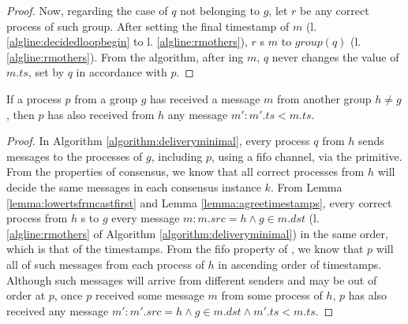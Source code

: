\documentclass[times, 10pt]{article}
\begin{document}
\begin{proof}
Now, regarding the case of $q$ not belonging to $g$, let $r$ be any correct process of such group. After setting the final timestamp of $m$ (l. \ref{algline:decidedloopbegin} to l. \ref{algline:rmothers}), $r$ \rmcast{}s $m$ to $group(q)$ (l. \ref{algline:rmothers}). From the algorithm, after \rmdel{}ing $m$, $q$ never changes the value of $m.ts$, set by $q$ in accordance with $p$.%
\end{proof}






\begin{lems} \label{lemma:groupfifo}
If a process $p$ from a group $g$ has received a message $m$ from another group $h \neq g$, then $p$ has also received from $h$ any message $m' : m'.ts < m.ts$.
\end{lems}

\begin{proof}
In Algorithm \ref{algorithm:deliveryminimal}, every process $q$ from $h$ sends messages to the processes of $g$, including $p$, using a fifo channel, via the \rmcast{} primitive. From the properties of consensus, we know that all correct processes from $h$ will decide the same messages in each consensus instance $k$. From Lemma \ref{lemma:lowertsfrmcastfirst} and Lemma \ref{lemma:agreetimestamps}, every correct process from $h$ \rmcast{}s to $g$ every message $m : m.src = h \wedge g \in m.dst$ (l. \ref{algline:rmothers} of Algorithm \ref{algorithm:deliveryminimal}) in the same order, which is that of the timestamps. From the fifo property of \rmcast{}, we know that $p$ will \rmdel{} all of such messages from each process of $h$ in ascending order of timestamps. Although such messages will arrive from different senders and may be out of order at $p$, once $p$ received some message $m$ from some process of $h$, $p$ has also received any message \mbox{$m' : m'.src = h \wedge g \in m.dst\wedge m'.ts < m.ts$}.
%
\end{proof}
\end{document}
